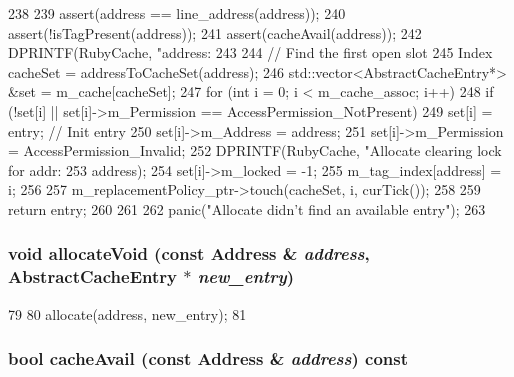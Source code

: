 \begin{DoxyCode}
238 {
239     assert(address == line_address(address));
240     assert(!isTagPresent(address));
241     assert(cacheAvail(address));
242     DPRINTF(RubyCache, "address: %
243 
244     // Find the first open slot
245     Index cacheSet = addressToCacheSet(address);
246     std::vector<AbstractCacheEntry*> &set = m_cache[cacheSet];
247     for (int i = 0; i < m_cache_assoc; i++) {
248         if (!set[i] || set[i]->m_Permission == AccessPermission_NotPresent) {
249             set[i] = entry;  // Init entry
250             set[i]->m_Address = address;
251             set[i]->m_Permission = AccessPermission_Invalid;
252             DPRINTF(RubyCache, "Allocate clearing lock for addr: %
253                     address);
254             set[i]->m_locked = -1;
255             m_tag_index[address] = i;
256 
257             m_replacementPolicy_ptr->touch(cacheSet, i, curTick());
258 
259             return entry;
260         }
261     }
262     panic("Allocate didn't find an available entry");
263 }
\end{DoxyCode}
\hypertarget{classCacheMemory_a97904b9885a944606b8d74fe48fa427a}{
\subsubsection[{allocateVoid}]{\setlength{\rightskip}{0pt plus 5cm}void allocateVoid (const {\bf Address} \& {\em address}, \/  {\bf AbstractCacheEntry} $\ast$ {\em new\_\-entry})}}
\label{classCacheMemory_a97904b9885a944606b8d74fe48fa427a}



\begin{DoxyCode}
79     {
80         allocate(address, new_entry);
81     }
\end{DoxyCode}
\hypertarget{classCacheMemory_add6ef1702fc19966e797bbebabf3cefa}{
\subsubsection[{cacheAvail}]{\setlength{\rightskip}{0pt plus 5cm}bool cacheAvail (const {\bf Address} \& {\em address}) const}}
\label{classCacheMemory_add6ef1702fc19966e797bbebabf3cefa}



